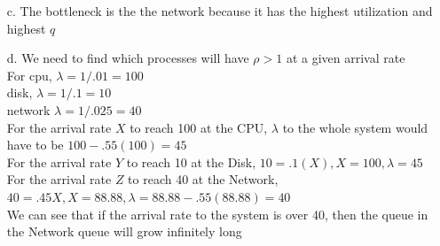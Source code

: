 \documentclass[11pt]{article}
\theoremstyle{definition}
\begin{document}
\begin{enumerate}
	\item[c.] The bottleneck is the the network because it has the highest utilization and highest $q$\\
	\item[d.] We need to find which processes will have $\rho > 1$ at a given arrival rate\\
	For cpu, $\lambda = 1 / .01 = 100$\\
	disk, $\lambda = 1 / .1 = 10$\\
	network $\lambda = 1 / .025 = 40$\\
	For the arrival rate $X$ to reach 100 at the CPU, $\lambda$ to the whole system would have to be $100 - .55(100) = 45$\\
	For the arrival rate $Y$ to reach 10 at the Disk, $10 = .1(X), X = 100, \lambda = 45$\\
	For the arrival rate $Z$ to reach 40 at the Network, $40 = .45X, X = 88.88, \lambda = 88.88 - .55(88.88)= 40$\\
	\newline
	We can see that if the arrival rate to the system is over 40, then the queue in the Network queue will grow infinitely long
	
\end{enumerate}
\end{document}
